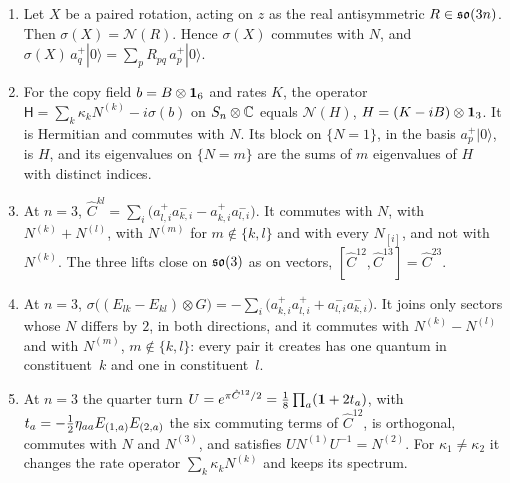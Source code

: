 \begin{theorem}
\label{e4:thm:fock}
\begin{enumerate}[label=(\roman*),leftmargin=2.2em]
\item Let $X$ be a paired rotation, acting on $z$ as the real antisymmetric $R\in\mathfrak{so}(3n)$. Then $\sigma(X)=\mathcal N(R)$. Hence $\sigma(X)$ commutes
with $N$, and $\sigma(X)\,a^+_q|0\rangle=\sum_pR_{pq}\,a^+_p|0\rangle$.
\item For the copy field $b=B\otimes\mathbf 1_6$ and rates $K$, the operator $\mathsf H=\sum_k\kappa_kN^{(k)}-i\sigma(b)$ on $S_n\otimes\mathbb{C}$ equals
$\mathcal N(H)$, $H=(K-iB)\otimes\mathbf 1_3$. It is Hermitian and commutes with $N$. Its block on $\{N=1\}$, in the basis $a^+_p|0\rangle$, is $H$, and its
eigenvalues on $\{N=m\}$ are the sums of $m$ eigenvalues of $H$ with distinct indices.
\item At $n=3$, $\hat C^{kl}=\sum_i\bigl(a^+_{l,i}a^-_{k,i}-a^+_{k,i}a^-_{l,i}\bigr)$. It commutes with $N$, with $N^{(k)}+N^{(l)}$, with $N^{(m)}$ for
$m\notin\{k,l\}$ and with every $N_{[i]}$, and not with $N^{(k)}$. The three lifts close on $\mathfrak{so}(3)$ as on vectors, $[\hat C^{12},\hat C^{13}]=\hat C^{23}$.
\item At $n=3$, $\sigma\bigl((E_{lk}-E_{kl})\otimes G\bigr)=-\sum_i\bigl(a^+_{k,i}a^+_{l,i}+a^-_{l,i}a^-_{k,i}\bigr)$. It joins only sectors whose $N$ differs
by $2$, in both directions, and it commutes with $N^{(k)}-N^{(l)}$ and with $N^{(m)}$, $m\notin\{k,l\}$: every pair it creates has one quantum in
constituent~$k$ and one in constituent~$l$.
\item At $n=3$ the quarter turn $U=e^{\pi\hat C^{12}/2}=\tfrac18\prod_a(\mathbf 1+2t_a)$, with $t_a=-\tfrac12\eta_{aa}E_{(1,a)}E_{(2,a)}$ the six commuting terms of
$\hat C^{12}$, is orthogonal, commutes with $N$ and $N^{(3)}$, and satisfies $UN^{(1)}U^{-1}=N^{(2)}$. For $\kappa_1\neq\kappa_2$ it changes the rate
operator $\sum_k\kappa_kN^{(k)}$ and keeps its spectrum.
\end{enumerate}
\end{theorem}

